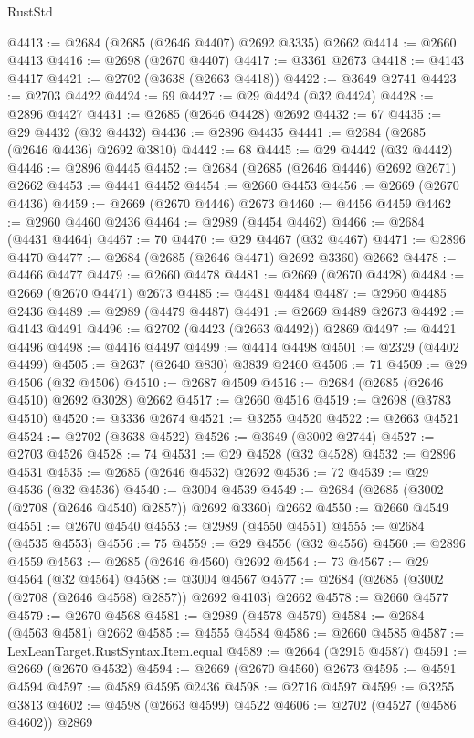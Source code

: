 \begin{lexlean}{RustStd}
\begin{coremodule}
@4413 := @2684 (@2685 (@2646 @4407) @2692 @3335) @2662
@4414 := @2660 @4413
@4416 := @2698 (@2670 @4407)
@4417 := @3361 @2673
@4418 := @4143 @4417
@4421 := @2702 (@3638 (@2663 @4418))
@4422 := @3649 @2741
@4423 := @2703 @4422
@4424 := 69
@4427 := @29 @4424 (@32 @4424)
@4428 := @2896 @4427
@4431 := @2685 (@2646 @4428) @2692
@4432 := 67
@4435 := @29 @4432 (@32 @4432)
@4436 := @2896 @4435
@4441 := @2684 (@2685 (@2646 @4436) @2692 @3810)
@4442 := 68
@4445 := @29 @4442 (@32 @4442)
@4446 := @2896 @4445
@4452 := @2684 (@2685 (@2646 @4446) @2692 @2671) @2662
@4453 := @4441 @4452
@4454 := @2660 @4453
@4456 := @2669 (@2670 @4436)
@4459 := @2669 (@2670 @4446) @2673
@4460 := @4456 @4459
@4462 := @2960 @4460 @2436
@4464 := @2989 (@4454 @4462)
@4466 := @2684 (@4431 @4464)
@4467 := 70
@4470 := @29 @4467 (@32 @4467)
@4471 := @2896 @4470
@4477 := @2684 (@2685 (@2646 @4471) @2692 @3360) @2662
@4478 := @4466 @4477
@4479 := @2660 @4478
@4481 := @2669 (@2670 @4428)
@4484 := @2669 (@2670 @4471) @2673
@4485 := @4481 @4484
@4487 := @2960 @4485 @2436
@4489 := @2989 (@4479 @4487)
@4491 := @2669 @4489 @2673
@4492 := @4143 @4491
@4496 := @2702 (@4423 (@2663 @4492)) @2869
@4497 := @4421 @4496
@4498 := @4416 @4497
@4499 := @4414 @4498
@4501 := @2329 (@4402 @4499)
@4505 := @2637 (@2640 @830) @3839 @2460
@4506 := 71
@4509 := @29 @4506 (@32 @4506)
@4510 := @2687 @4509
@4516 := @2684 (@2685 (@2646 @4510) @2692 @3028) @2662
@4517 := @2660 @4516
@4519 := @2698 (@3783 @4510)
@4520 := @3336 @2674
@4521 := @3255 @4520
@4522 := @2663 @4521
@4524 := @2702 (@3638 @4522)
@4526 := @3649 (@3002 @2744)
@4527 := @2703 @4526
@4528 := 74
@4531 := @29 @4528 (@32 @4528)
@4532 := @2896 @4531
@4535 := @2685 (@2646 @4532) @2692
@4536 := 72
@4539 := @29 @4536 (@32 @4536)
@4540 := @3004 @4539
@4549 := @2684 (@2685 (@3002 (@2708 (@2646 @4540) @2857)) @2692 @3360) @2662
@4550 := @2660 @4549
@4551 := @2670 @4540
@4553 := @2989 (@4550 @4551)
@4555 := @2684 (@4535 @4553)
@4556 := 75
@4559 := @29 @4556 (@32 @4556)
@4560 := @2896 @4559
@4563 := @2685 (@2646 @4560) @2692
@4564 := 73
@4567 := @29 @4564 (@32 @4564)
@4568 := @3004 @4567
@4577 := @2684 (@2685 (@3002 (@2708 (@2646 @4568) @2857)) @2692 @4103) @2662
@4578 := @2660 @4577
@4579 := @2670 @4568
@4581 := @2989 (@4578 @4579)
@4584 := @2684 (@4563 @4581) @2662
@4585 := @4555 @4584
@4586 := @2660 @4585
@4587 := LexLeanTarget.RustSyntax.Item.equal
@4589 := @2664 (@2915 @4587)
@4591 := @2669 (@2670 @4532)
@4594 := @2669 (@2670 @4560) @2673
@4595 := @4591 @4594
@4597 := @4589 @4595 @2436
@4598 := @2716 @4597
@4599 := @3255 @3813
@4602 := @4598 (@2663 @4599) @4522
@4606 := @2702 (@4527 (@4586 @4602)) @2869

\end{coremodule}
\end{lexlean}
